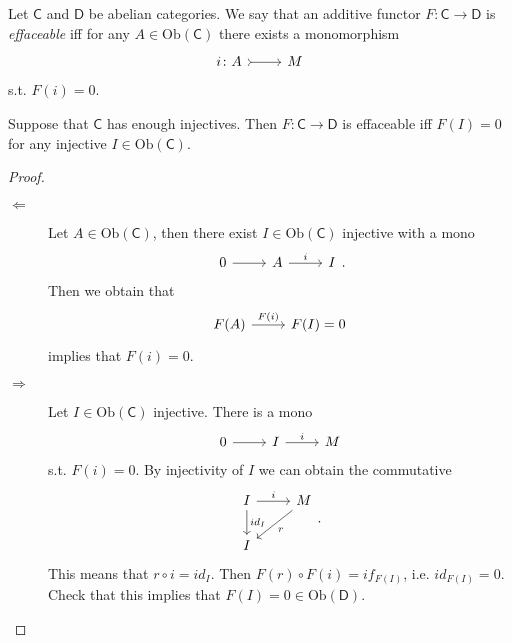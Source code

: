 \documentclass[../Main]{subfiles}
\begin{document}
\begin{defn}[]
	Let $\mathsf{C}$ and $\mathsf{D}$ be abelian categories.
	We say that an additive functor $F\colon \mathsf{C} \to \mathsf{D}$
	is {\em effaceable} iff
	for any $A \in \mathrm{Ob} \left(\mathsf{C}\right)$ there exists
	a monomorphism
	\begin{equation}
	\begin{tikzcd}
		i\colon A \arrow[r, "", rightarrowtail] &
		M
	\end{tikzcd}
	\end{equation} 
	s.t. $F(i) = 0$.
\end{defn}

\begin{prop}[]
	Suppose that $\mathsf{C}$ has enough injectives.
	Then $F\colon \mathsf{C} \to \mathsf{D}$ is effaceable iff
	$F(I) = 0$ for any injective $I \in \mathrm{Ob} \left(\mathsf{C}\right)$.
\end{prop}
\begin{proof}
\begin{description}
	\item[$\Leftarrow$]
		Let $A \in \mathrm{Ob} \left(\mathsf{C}\right)$, then
		there exist $I \in \mathrm{Ob} \left(\mathsf{C}\right)$
		injective with a mono
		\begin{equation}
		\begin{tikzcd}
			0 \arrow[r, "", rightarrow] &
			A \arrow[r, "i", rightarrow] &
			I
		\end{tikzcd}
		.\end{equation} 
		Then we obtain that
		\begin{equation}
		\begin{tikzcd}
			F(A) \arrow[r, "F(i)", rightarrow] &
			F(I) = 0
		\end{tikzcd}
		\end{equation} 
		implies that $F(i) = 0$.
	\item[$\Rightarrow$] Let $I \in \mathrm{Ob} \left(\mathsf{C}\right)$ injective.
		There is a mono
		\begin{equation}
		\begin{tikzcd}
			0 \arrow[r, "", rightarrow] &
			I \arrow[r, "i", rightarrow] &
			M
		\end{tikzcd}
		\end{equation} 
		s.t. $F(i) = 0$.
		By injectivity of $I$ we can obtain the commutative
		\begin{equation}
		\begin{tikzcd}
			I \arrow[r, "i", rightarrow] 
			\arrow[d, "id_I", rightarrow] &
			M \arrow[dl, "r", rightarrow] \\
			I &
		\end{tikzcd}
		.\end{equation} 
		This means that $r \circ i = id_I$.
		Then $F(r) \circ F(i) = if_{F(I)}$, i.e.
		$id_{F(I)} = 0$.
		Check that this implies that $F(I) = 0 \in \mathrm{Ob} \left(\mathsf{D}\right)$.
\end{description} 
\end{proof}
\end{document}
